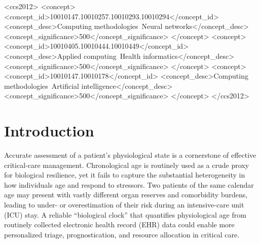 \documentclass[manuscript,screen,review]{acmart}
\begin{document}
\begin{CCSXML}
<ccs2012>
   <concept>
       <concept_id>10010147.10010257.10010293.10010294</concept_id>
       <concept_desc>Computing methodologies~Neural networks</concept_desc>
       <concept_significance>500</concept_significance>
       </concept>
   <concept>
       <concept_id>10010405.10010444.10010449</concept_id>
       <concept_desc>Applied computing~Health informatics</concept_desc>
       <concept_significance>500</concept_significance>
       </concept>
   <concept>
       <concept_id>10010147.10010178</concept_id>
       <concept_desc>Computing methodologies~Artificial intelligence</concept_desc>
       <concept_significance>500</concept_significance>
       </concept>
 </ccs2012>
\end{CCSXML}






\maketitle

\section{Introduction}

Accurate assessment of a patient’s physiological state is a cornerstone of effective critical-care management. Chronological age is routinely used as a crude proxy for biological resilience, yet it fails to capture the substantial heterogeneity in how individuals age and respond to stressors. Two patients of the same calendar age may present with vastly different organ reserves and comorbidity burdens, leading to under- or overestimation of their risk during an intensive-care unit (ICU) stay. A reliable “biological clock” that quantifies physiological age from routinely collected electronic health record (EHR) data could enable more personalized triage, prognostication, and resource allocation in critical care.
\end{document}
